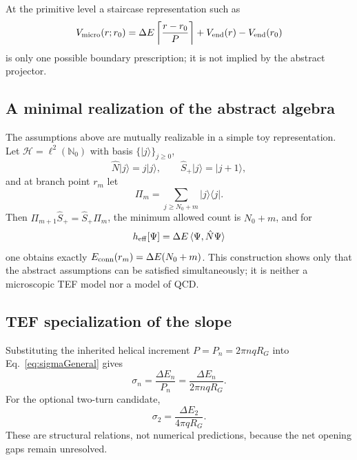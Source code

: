 \documentclass[10pt]{article}
\begin{document}
At the primitive level a staircase representation such as
\begin{equation}
V_{\rm micro}(r;r_0)
=\Delta E
\left\lceil\frac{r-r_0}{P}\right\rceil
+V_{\rm end}(r)-V_{\rm end}(r_0)
\label{eq:staircase}
\end{equation}
is only one possible boundary prescription; it is not implied by the abstract projector.

\subsection{A minimal realization of the abstract algebra}

The assumptions above are mutually realizable in a simple toy representation. Let $\mathcal H=\ell^2(\mathbb N_0)$ with basis $\{|j\rangle\}_{j\ge0}$,
\begin{equation}
\hat N|j\rangle=j|j\rangle,
\qquad
\hat S_+|j\rangle=|j+1\rangle,
\end{equation}
and at branch point $r_m$ let
\begin{equation}
\Pi_m=\sum_{j\ge N_0+m}|j\rangle\langle j|.
\end{equation}
Then $\Pi_{m+1}\hat S_+=\hat S_+\Pi_m$, the minimum allowed count is $N_0+m$, and for
\begin{equation}
h_{\rm eff}[\Psi]=\Delta E\,\langle\Psi,\hat N\Psi\rangle
\end{equation}
one obtains exactly $E_{\rm conn}(r_m)=\Delta E(N_0+m)$. This construction shows only that the abstract assumptions can be satisfied simultaneously; it is neither a microscopic TEF model nor a model of QCD.

\subsection{TEF specialization of the slope}

Substituting the inherited helical increment $P=P_n=2\pi nqR_G$ into Eq.~\eqref{eq:sigmaGeneral} gives
\begin{equation}
\boxed{
\sigma_n=\frac{\Delta E_n}{P_n}
=\frac{\Delta E_n}{2\pi n qR_G}.
}
\label{eq:sigman}
\end{equation}
For the optional two-turn candidate,
\begin{equation}
\boxed{\sigma_2=\frac{\Delta E_2}{4\pi qR_G}.}
\label{eq:sigma2}
\end{equation}
These are structural relations, not numerical predictions, because the net opening gaps remain unresolved.
\end{document}
